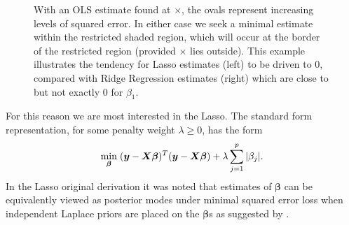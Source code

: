\documentclass{uwstat572}
\begin{document}
\begin{figure}\label{LassoPlot}
  \centering
  \caption{With an OLS estimate found at $\times$, the ovals represent increasing levels of squared error. In either case we seek a minimal estimate within the restricted shaded region, which will occur at the border of the restricted region (provided $\times$ lies outside). This example illustrates the tendency for Lasso estimates (left) to be driven to 0, compared with Ridge Regression estimates (right) which are close to but not exactly 0 for $\beta_1$.}
\end{figure}

For this reason we are most interested in the Lasso. The standard form representation, for some penalty weight $\lambda \geq 0$, has the form \[
\min_{\boldsymbol{\beta}}  \hspace{.1cm} (\boldsymbol{y}-\boldsymbol{X}\boldsymbol{\beta})^T(\boldsymbol{y}-\boldsymbol{X}\boldsymbol{\beta})+\lambda\sum_{j=1}^p|\beta_j|.
\] In the Lasso original derivation it was noted that estimates of $\boldsymbol\beta$ can be equivalently viewed as posterior modes under minimal squared error loss when independent Laplace priors are placed on the $\boldsymbol{\beta}$s as suggested by \cite{tibshirani1996regression}.
\end{document}
